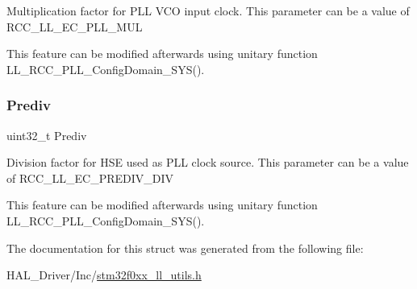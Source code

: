 Multiplication factor for P\+LL V\+CO input clock. This parameter can be a value of R\+C\+C\+\_\+\+L\+L\+\_\+\+E\+C\+\_\+\+P\+L\+L\+\_\+\+M\+UL

This feature can be modified afterwards using unitary function L\+L\+\_\+\+R\+C\+C\+\_\+\+P\+L\+L\+\_\+\+Config\+Domain\+\_\+\+S\+Y\+S(). \mbox{\label{struct_l_l___u_t_i_l_s___p_l_l_init_type_def_ad1b63b2eb36e28612c093044511dab54}} 
\subsubsection{\texorpdfstring{Prediv}{Prediv}}
{\footnotesize\ttfamily uint32\+\_\+t Prediv}

Division factor for H\+SE used as P\+LL clock source. This parameter can be a value of R\+C\+C\+\_\+\+L\+L\+\_\+\+E\+C\+\_\+\+P\+R\+E\+D\+I\+V\+\_\+\+D\+IV

This feature can be modified afterwards using unitary function L\+L\+\_\+\+R\+C\+C\+\_\+\+P\+L\+L\+\_\+\+Config\+Domain\+\_\+\+S\+Y\+S(). 

The documentation for this struct was generated from the following file\+:\begin{DoxyCompactItemize}
\item 
H\+A\+L\+\_\+\+Driver/\+Inc/\hyperlink{stm32f0xx__ll__utils_8h}{stm32f0xx\+\_\+ll\+\_\+utils.\+h}\end{DoxyCompactItemize}
